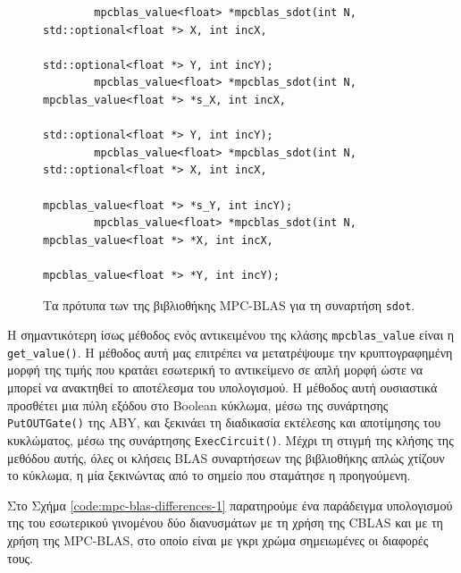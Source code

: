 \begin{figure}[h!]
    \begin{center}
        \begin{verbatim}
        mpcblas_value<float> *mpcblas_sdot(int N, std::optional<float *> X, int incX,
                                                std::optional<float *> Y, int incY);
        mpcblas_value<float> *mpcblas_sdot(int N, mpcblas_value<float *> *s_X, int incX,
                                                std::optional<float *> Y, int incY);
        mpcblas_value<float> *mpcblas_sdot(int N, std::optional<float *> X, int incX,
                                                mpcblas_value<float *> *s_Y, int incY);
        mpcblas_value<float> *mpcblas_sdot(int N, mpcblas_value<float *> *X, int incX,
                                                mpcblas_value<float *> *Y, int incY);
        \end{verbatim}
    \end{center}
    \caption{Τα πρότυπα των της βιβλιοθήκης MPC-BLAS για τη συναρτήση \texttt{sdot}.}
    \label{code:mpcblas-sdot}
\end{figure}

Η σημαντικότερη ίσως μέθοδος ενός αντικειμένου της κλάσης \texttt{mpcblas_value} είναι η \texttt{get_value()}. Η μέθοδος αυτή μας επιτρέπει να μετατρέψουμε την κρυπτογραφημένη μορφή της τιμής που κρατάει εσωτερική το αντικείμενο σε απλή μορφή ώστε να μπορεί να ανακτηθεί το αποτέλεσμα του υπολογισμού. Η μέθοδος αυτή ουσιαστικά προσθέτει μια πύλη εξόδου στο Boolean κύκλωμα, μέσω της συνάρτησης \texttt{PutOUTGate()} της ABY, και ξεκινάει τη διαδικασία εκτέλεσης και αποτίμησης του κυκλώματος, μέσω της συνάρτησης \texttt{ExecCircuit()}. Μέχρι τη στιγμή της κλήσης της μεθόδου αυτής, όλες οι κλήσεις BLAS συναρτήσεων της βιβλιοθήκης απλώς χτίζουν το κύκλωμα, η μία ξεκινώντας από το σημείο που σταμάτησε η προηγούμενη.

Στο Σχήμα \ref{code:mpc-blas-differences-1} παρατηρούμε ένα παράδειγμα υπολογισμού της του εσωτερικού γινομένου δύο διανυσμάτων με τη χρήση της CBLAS και με τη χρήση της MPC-BLAS, στο οποίο είναι με γκρι χρώμα σημειωμένες οι διαφορές τους.

